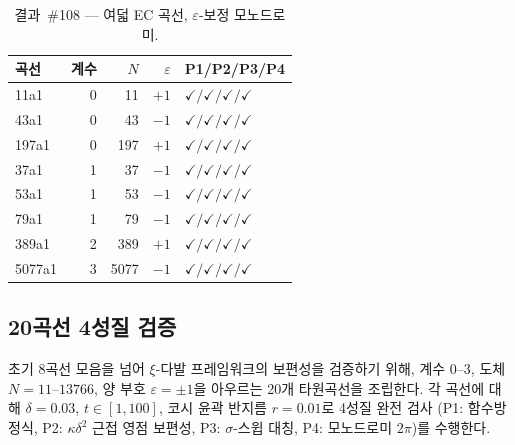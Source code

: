 \documentclass[11pt, a4paper]{article}
\theoremstyle{plain}
\theoremstyle{definition}
\begin{document}
\begin{table}[ht]
\centering
\caption{결과~\#108 — 여덟 EC 곡선, $\varepsilon$-보정 모노드로미.}
\label{tab:ec108}
\small
\begin{tabular}{lrrrl}
\toprule
곡선 & 계수 & $N$ & $\varepsilon$ & P1/P2/P3/P4 \\
\midrule
11a1  & 0 & 11   & $+1$ & $\checkmark/\checkmark/\checkmark/\checkmark$ \\
43a1  & 0 & 43   & $-1$ & $\checkmark/\checkmark/\checkmark/\checkmark$ \\
197a1 & 0 & 197  & $+1$ & $\checkmark/\checkmark/\checkmark/\checkmark$ \\
37a1  & 1 & 37   & $-1$ & $\checkmark/\checkmark/\checkmark/\checkmark$ \\
53a1  & 1 & 53   & $-1$ & $\checkmark/\checkmark/\checkmark/\checkmark$ \\
79a1  & 1 & 79   & $-1$ & $\checkmark/\checkmark/\checkmark/\checkmark$ \\
389a1 & 2 & 389  & $+1$ & $\checkmark/\checkmark/\checkmark/\checkmark$ \\
5077a1& 3 & 5077 & $-1$ & $\checkmark/\checkmark/\checkmark/\checkmark$ \\
\bottomrule
\end{tabular}
\end{table}


\subsection{20곡선 4성질 검증}
\label{ssec:20curve}

초기 8곡선 모음을 넘어 $\xi$-다발 프레임워크의 보편성을 검증하기 위해,
계수 $0$--$3$, 도체 $N=11$--$13766$, 양 부호
$\varepsilon=\pm 1$을 아우르는 20개 타원곡선을 조립한다.
각 곡선에 대해 $\delta=0.03$, $t\in[1,100]$,
코시 윤곽 반지름 $r=0.01$로 4성질 완전 검사
(P1: 함수방정식, P2: $\kappa\delta^{2}$ 근접 영점 보편성,
P3: $\sigma$-스윕 대칭, P4: 모노드로미 $2\pi$)를 수행한다.
\end{document}
